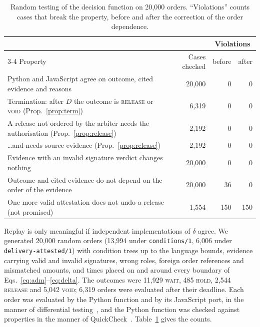 \documentclass[10pt,a4paper]{article}
\newcommand{\code}[1]{\texttt{\small #1}}
\newcommand{\rel}{\textup{\textsc{release}}}
\newcommand{\void}{\textup{\textsc{void}}}
\newcommand{\hold}{\textup{\textsc{hold}}}
\newcommand{\wait}{\textup{\textsc{wait}}}
\theoremstyle{tight}
\begin{document}
\begin{table}[t]
\centering\small
\caption{Random testing of the decision function on 20,000 orders. ``Violations'' counts cases that break the
property, before and after the correction of the order dependence.}
\label{tab:props}
\begin{tabular}{@{}p{11.2cm}rrr@{}}
\toprule
 & & \multicolumn{2}{c}{Violations} \\
\cmidrule(l){3-4}
Property & Cases checked & before & after \\
\midrule
Python and JavaScript agree on outcome, cited evidence and reasons & 20,000 & 0 & 0 \\
Termination: after $D$ the outcome is \rel{} or \void{} (Prop.~\ref{prop:term}) & 6,319 & 0 & 0 \\
A release not ordered by the arbiter needs the authorisation (Prop.~\ref{prop:release}) & 2,192 & 0 & 0 \\
\quad \ldots and needs source evidence (Prop.~\ref{prop:release}) & 2,192 & 0 & 0 \\
Evidence with an invalid signature verdict changes nothing & 20,000 & 0 & 0 \\
Outcome and cited evidence do not depend on the order of the evidence & 20,000 & 36 & 0 \\
One more valid attestation does not undo a release (not promised) & 1,554 & 150 & 150 \\
\bottomrule
\end{tabular}
\end{table}

Replay is only meaningful if independent implementations of $\delta$ agree. We generated 20,000 random orders
(13,994 under \code{conditions/1}, 6,006 under \code{delivery-attested/1}) with condition trees up to the language
bounds, evidence carrying valid and invalid signatures, wrong roles, foreign order references and mismatched
amounts, and times placed on and around every boundary of Eqs.~\eqref{eq:adm}--\eqref{eq:delta}. The outcomes were
11,929 \wait, 485 \hold, 2,544 \rel{} and 5,042 \void; 6,319 orders were evaluated after their deadline. Each order
was evaluated by the Python function and by its JavaScript port, in the manner of differential
testing~\cite{mckeeman1998,brubaker2014}, and the Python function was checked against properties in the manner of
QuickCheck~\cite{claessen2000}. Table~\ref{tab:props} gives the counts.
\end{document}
